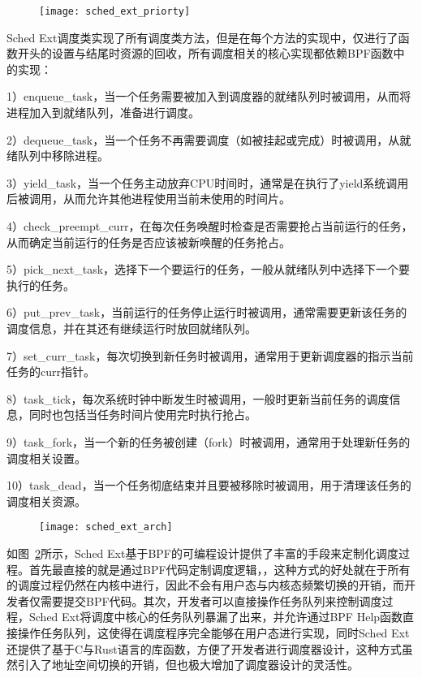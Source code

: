 \begin{figure}[!htbp]
    \centering
    \texttt{[image: sched\_ext\_priorty]}
    \label{fig:sched_ext_priorty}
\end{figure}

Sched Ext调度类实现了所有调度类方法，但是在每个方法的实现中，仅进行了函数开头的设置与结尾时资源的回收，所有调度相关的核心实现都依赖BPF函数中的实现：

1）enqueue\_task，当一个任务需要被加入到调度器的就绪队列时被调用，从而将进程加入到就绪队列，准备进行调度。

2）dequeue\_task，当一个任务不再需要调度（如被挂起或完成）时被调用，从就绪队列中移除进程。

3）yield\_task，当一个任务主动放弃CPU时间时，通常是在执行了yield系统调用后被调用，从而允许其他进程使用当前未使用的时间片。

4）check\_preempt\_curr，在每次任务唤醒时检查是否需要抢占当前运行的任务，从而确定当前运行的任务是否应该被新唤醒的任务抢占。

5）pick\_next\_task，选择下一个要运行的任务，一般从就绪队列中选择下一个要执行的任务。

6）put\_prev\_task，当前运行的任务停止运行时被调用，通常需要更新该任务的调度信息，并在其还有继续运行时放回就绪队列。

7）set\_curr\_task，每次切换到新任务时被调用，通常用于更新调度器的指示当前任务的curr指针。

8）task\_tick，每次系统时钟中断发生时被调用，一般时更新当前任务的调度信息，同时也包括当任务时间片使用完时执行抢占。

9）task\_fork，当一个新的任务被创建（fork）时被调用，通常用于处理新任务的调度相关设置。

10）task\_dead，当一个任务彻底结束并且要被移除时被调用，用于清理该任务的调度相关资源。


\begin{figure}[!htbp]
    \centering
    \texttt{[image: sched\_ext\_arch]}
    \label{fig:sched_ext_arch}
\end{figure}

如图~\ref{fig:sched_ext_arch}所示，Sched Ext基于BPF的可编程设计提供了丰富的手段来定制化调度过程。首先最直接的就是通过BPF代码定制调度逻辑，，这种方式的好处就在于所有的调度过程仍然在内核中进行，因此不会有用户态与内核态频繁切换的开销，而开发者仅需要提交BPF代码。其次，开发者可以直接操作任务队列来控制调度过程，Sched Ext将调度中核心的任务队列暴漏了出来，并允许通过BPF Help函数直接操作任务队列，这使得在调度程序完全能够在用户态进行实现，同时Sched Ext还提供了基于C与Rust语言的库函数，方便了开发者进行调度器设计，这种方式虽然引入了地址空间切换的开销，但也极大增加了调度器设计的灵活性。

